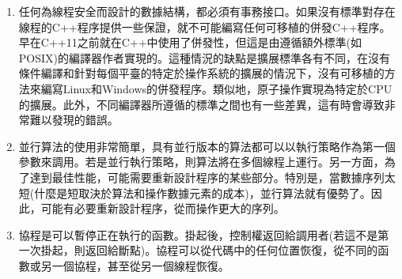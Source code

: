\begin{enumerate}
\item 
任何為線程安全而設計的數據結構，都必須有事務接口。如果沒有標準對存在線程的C++程序提供一些保證，就不可能編寫任何可移植的併發C++程序。早在C++11之前就在C++中使用了併發性，但這是由遵循額外標準(如POSIX)的編譯器作者實現的。這種情況的缺點是擴展標準各有不同，在沒有條件編譯和針對每個平臺的特定於操作系統的擴展的情況下，沒有可移植的方法來編寫Linux和Windows的併發程序。類似地，原子操作實現為特定於CPU的擴展。此外，不同編譯器所遵循的標準之間也有一些差異，這有時會導致非常難以發現的錯誤。

\item 
並行算法的使用非常簡單，具有並行版本的算法都可以以執行策略作為第一個參數來調用。若是並行執行策略，則算法將在多個線程上運行。另一方面，為了達到最佳性能，可能需要重新設計程序的某些部分。特別是，當數據序列太短(什麼是短取決於算法和操作數據元素的成本)，並行算法就有優勢了。因此，可能有必要重新設計程序，從而操作更大的序列。

\item 
協程是可以暫停正在執行的函數。掛起後，控制權返回給調用者(若這不是第一次掛起，則返回給斷點)。協程可以從代碼中的任何位置恢復，從不同的函數或另一個協程，甚至從另一個線程恢復。

\end{enumerate}